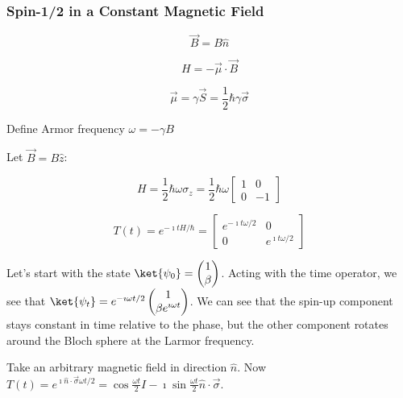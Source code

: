 \documentclass[a4paper,twoside,master.tex]{subfiles}
\begin{document}
\subsubsection{Spin-1/2 in a Constant Magnetic
Field}

\begin{equation}
\vec{B} = B\hat{n}
\end{equation}

\begin{equation}
H=-\vec{\mu}\cdot\vec{B}
\end{equation}

\begin{equation}
\vec{\mu}=\gamma\vec{S} = \frac{1}{2}\hbar\gamma\vec{\sigma}
\end{equation}

Define Armor frequency $\omega = -\gamma B$

Let $\vec{B} = B\hat{z}$:

\begin{equation}
H = \frac{1}{2}\hbar\omega\sigma_z = \frac{1}{2}\hbar\omega\begin{bmatrix}1&0\\0&-1\end{bmatrix}
\end{equation}

\begin{equation}
T(t) = e^{-\imath t H/\hbar} = \begin{bmatrix}e^{-\imath t\omega/2}&0\\0&e^{\imath t\omega/2}\end{bmatrix}
\end{equation}

Let's start with the state
$\ket{\psi_0} = \begin{pmatrix}1\\\beta\end{pmatrix}$. Acting with
the time operator, we see that
$\ket{\psi_t} = e^{-\imath\omega t/2}\begin{pmatrix}1\\\beta e^{\imath\omega t}\end{pmatrix}$.
We can see that the spin-up component stays constant in time relative to
the phase, but the other component rotates around the Bloch sphere at
the Larmor frequency.

Take an arbitrary magnetic field in direction $\hat{n}$. Now
$T(t) = e^{\imath\hat{n}\cdot\vec{\sigma}\omega t/2} = \cos\frac{\omega t}{2} I-\imath\sin\frac{\omega t}{2}\hat{n}\cdot\vec{\sigma}$.
\end{document}
